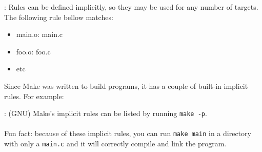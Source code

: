 

\begin{frame}{\secname: \small\subsecname\normalsize}
    Rules can be defined implicitly, so they may be used for any number of targets. The following rule bellow matches:

    \makeImplicit

    \begin{itemize}
        \item main.o: main.c
        \item foo.o: foo.c
        \item etc
    \end{itemize}

    Since Make was written to build programs, it has a couple of built-in implicit rules. For example:

    \makeImplicitCFile

\end{frame}

\begin{frame}{\secname: \small\subsecname\normalsize}
    (GNU) Make's implicit rules can be listed by running \texttt{make -p}. \\~\\

    Fun fact: because of these implicit rules, you can run \texttt{make main} in a directory with only a \texttt{main.c} and it will correctly compile and link the program.

\end{frame}
